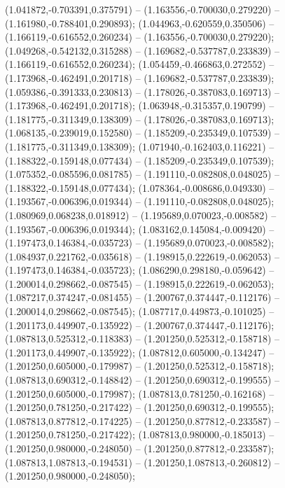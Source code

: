  (1.041872,-0.703391,0.375791) -- (1.163556,-0.700030,0.279220) -- (1.161980,-0.788401,0.290893);
 (1.044963,-0.620559,0.350506) -- (1.166119,-0.616552,0.260234) -- (1.163556,-0.700030,0.279220);
 (1.049268,-0.542132,0.315288) -- (1.169682,-0.537787,0.233839) -- (1.166119,-0.616552,0.260234);
 (1.054459,-0.466863,0.272552) -- (1.173968,-0.462491,0.201718) -- (1.169682,-0.537787,0.233839);
 (1.059386,-0.391333,0.230813) -- (1.178026,-0.387083,0.169713) -- (1.173968,-0.462491,0.201718);
 (1.063948,-0.315357,0.190799) -- (1.181775,-0.311349,0.138309) -- (1.178026,-0.387083,0.169713);
 (1.068135,-0.239019,0.152580) -- (1.185209,-0.235349,0.107539) -- (1.181775,-0.311349,0.138309);
 (1.071940,-0.162403,0.116221) -- (1.188322,-0.159148,0.077434) -- (1.185209,-0.235349,0.107539);
 (1.075352,-0.085596,0.081785) -- (1.191110,-0.082808,0.048025) -- (1.188322,-0.159148,0.077434);
 (1.078364,-0.008686,0.049330) -- (1.193567,-0.006396,0.019344) -- (1.191110,-0.082808,0.048025);
 (1.080969,0.068238,0.018912) -- (1.195689,0.070023,-0.008582) -- (1.193567,-0.006396,0.019344);
 (1.083162,0.145084,-0.009420) -- (1.197473,0.146384,-0.035723) -- (1.195689,0.070023,-0.008582);
 (1.084937,0.221762,-0.035618) -- (1.198915,0.222619,-0.062053) -- (1.197473,0.146384,-0.035723);
 (1.086290,0.298180,-0.059642) -- (1.200014,0.298662,-0.087545) -- (1.198915,0.222619,-0.062053);
 (1.087217,0.374247,-0.081455) -- (1.200767,0.374447,-0.112176) -- (1.200014,0.298662,-0.087545);
 (1.087717,0.449873,-0.101025) -- (1.201173,0.449907,-0.135922) -- (1.200767,0.374447,-0.112176);
 (1.087813,0.525312,-0.118383) -- (1.201250,0.525312,-0.158718) -- (1.201173,0.449907,-0.135922);
 (1.087812,0.605000,-0.134247) -- (1.201250,0.605000,-0.179987) -- (1.201250,0.525312,-0.158718);
 (1.087813,0.690312,-0.148842) -- (1.201250,0.690312,-0.199555) -- (1.201250,0.605000,-0.179987);
 (1.087813,0.781250,-0.162168) -- (1.201250,0.781250,-0.217422) -- (1.201250,0.690312,-0.199555);
 (1.087813,0.877812,-0.174225) -- (1.201250,0.877812,-0.233587) -- (1.201250,0.781250,-0.217422);
 (1.087813,0.980000,-0.185013) -- (1.201250,0.980000,-0.248050) -- (1.201250,0.877812,-0.233587);
 (1.087813,1.087813,-0.194531) -- (1.201250,1.087813,-0.260812) -- (1.201250,0.980000,-0.248050);
